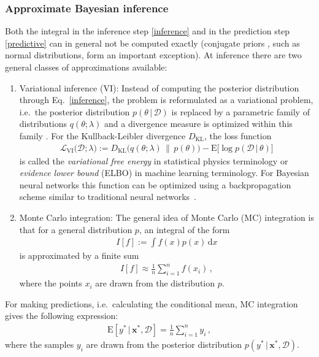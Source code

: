 \documentclass[smallcondensed]{svjour3}
\newcommand{\intd}{\,\mathrm{d}}
\begin{document}
\subsubsection*{Approximate Bayesian inference}

    Both the integral in the inference step \eqref{inference} and in the prediction step \eqref{predictive} can in general not be computed exactly (conjugate priors \cite{Fink97acompendium}, such as normal distributions, form an important exception). At inference there are two general classes of approximations available:
    \begin{enumerate}
        \item Variational inference (VI):
        Instead of computing the posterior distribution through Eq.~\eqref{inference}, the problem is reformulated as a variational problem, i.e.\ the posterior distribution $p(\theta\,|\,\mathcal{D})$ is replaced by a parametric family of distributions $q(\theta;\lambda)$ and a divergence measure is optimized within this family \cite{blei2017variational}. For the Kullback-Leibler divergence $D_\text{KL}$, the loss function
        \begin{gather}
            \mathcal{L}_\text{VI}\big(\mathcal{D};\lambda) := D_\text{KL}\big(q(\theta;\lambda)\,\|\,p(\theta)\big) - \mathrm{E}\big[\log p(\mathcal{D}\,|\,\theta)\big]
        \end{gather}
        is called the \textit{variational free energy} in statistical physics terminology or \textit{evidence lower bound} (ELBO) in machine learning terminology. For Bayesian neural networks this function can be optimized using a backpropagation scheme similar to traditional neural networks~\cite{blundell2015weight}.

        \item Monte Carlo integration: The general idea of Monte Carlo (MC) integration \cite{gentle2009monte} is that for a general distribution $p$, an integral of the form
        \begin{gather}
            I[f] := \int f(x)p(x)\intd x
        \end{gather}
        is approximated by a finite sum
        \begin{gather}
            \label{mc_int}
            I[f]\approx\frac{1}{n}\sum_{i=1}^n f(x_i)\,,
        \end{gather}
        where the points $x_i$ are drawn from the distribution $p$.
    \end{enumerate}
    For making predictions, i.e.\ calculating the conditional mean, MC integration gives the following expression:
    \begin{gather}
        \mathrm{E}[y^*\,|\,\mathbf{x}^*,\mathcal{D}] = \frac{1}{n}\sum_{i=1}^n y_i\,,
    \end{gather}
    where the samples $y_i$ are drawn from the posterior distribution $p(y^*\,|\,\mathbf{x}^*,\mathcal{D})$.
\end{document}
